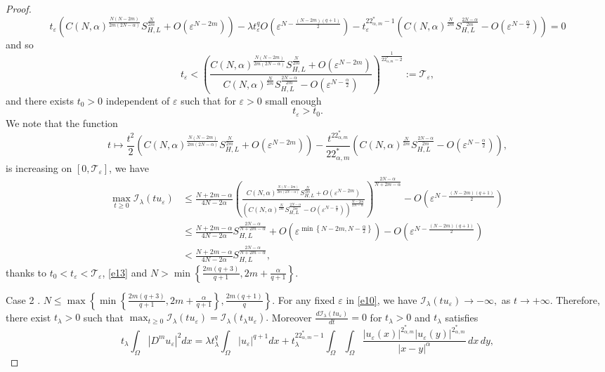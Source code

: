 \documentclass[reqno]{amsart}
\newcommand{\DD} {\displaystyle}
\newcommand{\la} {\lambda}
\newcommand{\eps}{\varepsilon}
\newcommand{\Om}{\Omega}
\newcommand{\al} {\alpha}
\newcommand{\mc} {\mathcal}
\numberwithin{theorem}{section} \numberwithin{equation}{section}
\begin{document}
\begin{proof}
\[t_{\eps}\left(C(N, \al)^{\frac{N(N-2m)}{2m(2N-\al)}} S_{H, L}^{\frac{N}{2m}}+O\left(\eps^{N-2m}\right)\right)-\la t_\eps^q O\left(\eps^{N-\frac{(N-2m)(q+1)}{2}}\right)-t_\eps^{22_{\al, m}^*-1}\left(C(N, \al)^{\frac{N}{2m}} S_{H, L}^{\frac{2N-\al}{2m}}-O\left(\eps^{N-\frac{\al}{2}}\right)\right)=0
\]
and so
\[
t_\eps<\left(\frac{C(N, \al)^{\frac{N(N-2m)}{2m(2N-\al)}} S_{H, L}^{\frac{N}{2m}}+O\left(\eps^{N-2m}\right)}{C(N, \al)^{\frac{N}{2m}} S_{H, L}^{\frac{2N-\al}{2m}}-O\left(\eps^{N-\frac{\al}{2}}\right)}\right)^{\frac{1}{22_{\al, m}^*-2}}:=\mc{T}_\eps,
\]
and there exists $t_0>0$ independent of $\eps$ such that for $\eps>0$ small enough
\[t_\eps>t_0.\]
We note that the function
\[
t \mapsto \frac{t^2}{2}\left(C(N, \al)^{\frac{N(N-2m)}{2m(2N-\al)}} S_{H, L}^{\frac{N}{2m}}+O\left(\eps^{N-2m}\right)\right)-\frac{t^{22_{\al, m}^*}}{22_{\al, m}^*}\left(C(N, \al)^{\frac{N}{2m}} S_{H, L}^{\frac{2N-\al}{2m}}-O\left(\eps^{N-\frac{\al}{2}}\right)\right),
\]
is increasing on $\left[0, \mc{T}_\eps\right]$, we have
\begin{align*}
\max _{t \geq 0} \mc{I_\la}\left(t u_{\eps}\right) & \leq \frac{N+2m-\al}{4 N-2 \al}\left(\frac{C(N, \al)^{\frac{N(N-2m)}{2m(2N-\al)}} S_{H, L}^{\frac{N}{2m}}+O\left(\eps^{N-2m}\right)}{\left(C(N, \al)^{\frac{N}{2m}} S_{H, L}^{\frac{2N-\al}{2m}}-O\left(\eps^{N-\frac{\al}{2}}\right)\right)^{\frac{N-2m}{2N-\al}}}\right)^{\frac{2N-\al}{N+2m-\al}}-O\left(\eps^{N-\frac{(N-2m)(q+1)}{2}}\right)\ \\
& \leq \frac{N+2m-\al}{4N-2\al} S_{H, L}^{\frac{2N-\al}{N+2m-\al}}+O\left(\eps^{\min \left\{N-2m, {N-\frac{\al}{2}}\right\}}\right)-O\left(\eps^{N-\frac{(N-2m)(q+1)}{2}}\right) \\
& <\frac{N+2m-\al}{4N-2\al} S_{H, L}^{\frac{2N-\al}{N+2m-\al}},
\end{align*}
thanks to $t_0<t_{\eps}<\mc{T}_\eps$, \eqref{e13} and $N>\min \left\{\frac{2m(q+3)}{q+1}, 2m+\frac{\al}{q+1}\right\}$.
\item[Case 2]. 
$N \leq \max \left\{\min \left\{\frac{2m(q+3)}{q+1}, 2m+\frac{\al}{q+1}\right\}, \frac{2m(q+1)}{q}\right\}$.
For any fixed $\eps$ in \eqref{e10}, we have $\mc{I_\la}\left(t u_{\eps}\right) \rightarrow-\infty,$ as $t \rightarrow+\infty$. 
Therefore, there exist $t_\la>0$ such that
$\DD\max _{t \geq 0} \mc{I_\la}\left(t u_{\eps}\right)=\mc{I_\la}\left(t_{\la} u_{\eps}\right).$
Moreover $\frac{d \mc{I_\la}(t u_\eps)}{d t}=0$ for $t_\la>0$ and $t_\la$ satisfies
\[t_\la \int_{\Om}\left|D^m u_{\eps}\right|^2 d x=\la t_\la^q \int_{\Om}\left|u_{\eps}\right|^{q+1} d x+t_\la^{22_{\al, m}^*-1} \int_{\Om} \int_{\Om} \frac{\left|u_{\eps}(x)\right|^{2_{\al, m}^*}\left|u_{\eps}(y)\right|^{2_{\al, m}^*}}{|x-y|^\al} \, dx \, dy, \]

\end{proof}
\end{document}
